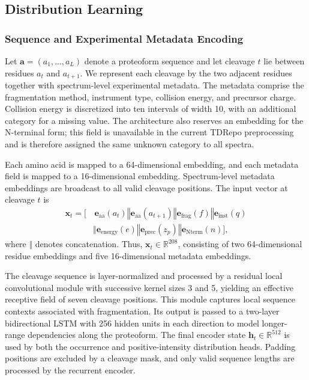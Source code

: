 \subsection{Distribution Learning}
\label{sec:distribution_learning}

\subsubsection{Sequence and Experimental Metadata Encoding}
\label{sec:sequence_encoding}

Let $\mathbf{a}=(a_1,\ldots,a_L)$ denote a proteoform sequence and let cleavage
$t$ lie between residues $a_t$ and $a_{t+1}$. We represent each cleavage by
the two adjacent residues together with spectrum-level experimental metadata.
The metadata comprise the fragmentation method, instrument type, collision
energy, and precursor charge. Collision energy is discretized into ten
intervals of width 10, with an additional category for a missing value. The
architecture also reserves an embedding for the N-terminal form; this field
is unavailable in the current TDRepo preprocessing and is therefore assigned
the same unknown category to all spectra.

Each amino acid is mapped to a 64-dimensional embedding, and each metadata
field is mapped to a 16-dimensional embedding. Spectrum-level metadata
embeddings are broadcast to all valid cleavage positions. The input vector at
cleavage $t$ is
\begin{equation}
\begin{split}
    \mathbf{x}_t = [&\,\mathbf{e}_{\mathrm{aa}}(a_t)
    \mathbin\Vert \mathbf{e}_{\mathrm{aa}}(a_{t+1})
    \mathbin\Vert \mathbf{e}_{\mathrm{frag}}(f)
    \mathbin\Vert \mathbf{e}_{\mathrm{inst}}(q)\\
    &\mathbin\Vert \mathbf{e}_{\mathrm{energy}}(e)
    \mathbin\Vert \mathbf{e}_{\mathrm{prec}}(z_p)
    \mathbin\Vert \mathbf{e}_{\mathrm{Nterm}}(n)],
\end{split}
\label{eq:cleavage_input}
\end{equation}
where $\mathbin\Vert$ denotes concatenation. Thus,
$\mathbf{x}_t\in\mathbb{R}^{208}$, consisting of two 64-dimensional residue
embeddings and five 16-dimensional metadata embeddings.

The cleavage sequence is layer-normalized and processed by a residual local
convolutional module with successive kernel sizes 3 and 5, yielding an
effective receptive field of seven cleavage positions. This module captures
local sequence contexts associated with fragmentation. Its output is passed
to a two-layer bidirectional LSTM with 256 hidden units in each direction to
model longer-range dependencies along the proteoform. The final encoder state
$\mathbf{h}_t\in\mathbb{R}^{512}$ is used by both the occurrence and
positive-intensity distribution heads. Padding positions are excluded by a
cleavage mask, and only valid sequence lengths are processed by the recurrent
encoder.

